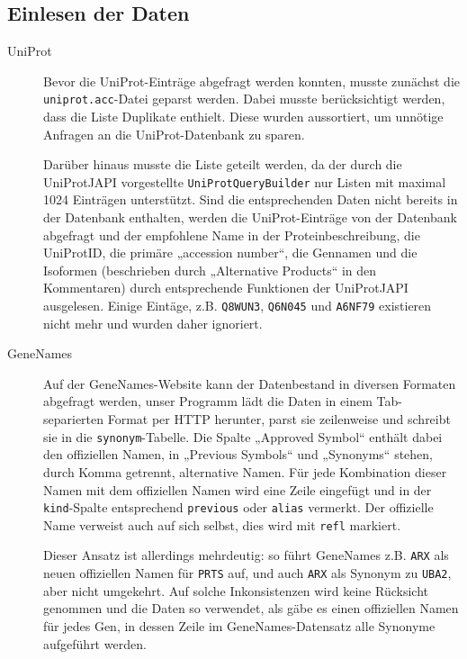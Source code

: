 \documentclass{scrartcl}
\begin{document}
\subsection{Einlesen der Daten}

\begin{description}
\item[UniProt]
Bevor die UniProt-Einträge abgefragt werden konnten, musste zunächst die \texttt{uniprot.acc}-Datei geparst werden. Dabei musste berücksichtigt werden, dass die Liste Duplikate enthielt. Diese wurden aussortiert, um unnötige Anfragen an die UniProt-Datenbank zu sparen.

Darüber hinaus musste die Liste geteilt werden, da der durch die UniProtJAPI vorgestellte \texttt{UniProtQueryBuilder} nur Listen mit maximal 1024 Einträgen unterstützt. Sind die entsprechenden Daten nicht bereits in der Datenbank enthalten, werden die UniProt-Einträge von der Datenbank abgefragt und der empfohlene Name in der Proteinbeschreibung, die UniProtID, die primäre „accession number“, die Gennamen und die Isoformen (beschrieben durch „Alternative Products“ in den Kommentaren) durch entsprechende Funktionen der UniProtJAPI ausgelesen.
Einige Eintäge, z.B. \texttt{Q8WUN3}, \texttt{Q6N045} und \texttt{A6NF79} existieren nicht mehr und wurden daher ignoriert.

\item[GeneNames]
Auf der GeneNames-Website kann der Datenbestand in diversen Formaten abgefragt werden, unser Programm lädt die Daten in einem Tab-separierten Format per HTTP herunter, parst sie zeilenweise und schreibt sie in die \texttt{synonym}-Tabelle. Die Spalte „Approved Symbol“ enthält dabei den offiziellen Namen, in „Previous Symbols“ und „Synonyms“ stehen, durch Komma getrennt, alternative Namen. Für jede Kombination dieser Namen mit dem offiziellen Namen wird eine Zeile eingefügt und in der \texttt{kind}-Spalte entsprechend \texttt{previous} oder \texttt{alias} vermerkt. Der offizielle Name verweist auch auf sich selbst, dies wird mit \texttt{refl} markiert.

Dieser Ansatz ist allerdings mehrdeutig: so führt GeneNames z.B. \texttt{ARX} als neuen offiziellen Namen für \texttt{PRTS} auf, und auch \texttt{ARX} als Synonym zu \texttt{UBA2}, aber nicht umgekehrt. Auf solche Inkonsistenzen wird keine Rücksicht genommen und die Daten so verwendet, als gäbe es einen offiziellen Namen für jedes Gen, in dessen Zeile im GeneNames-Datensatz alle Synonyme aufgeführt werden.


\end{description}
\end{document}

